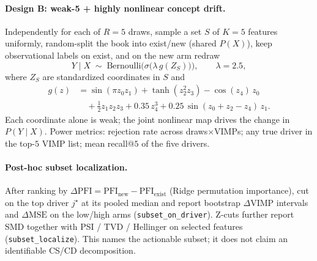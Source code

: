 \paragraph{Design B: weak-5 + highly nonlinear concept drift.}
Independently for each of $R=5$ draws, sample a set $S$ of $K=5$ features uniformly,
random-split the book into exist/new (shared $P(X)$), keep observational labels on
exist, and on the new arm redraw
\begin{equation}
  Y\mid X
  \;\sim\;
  \mathrm{Bernoulli}\!\bigl(
    \sigma\bigl(\lambda\, g(Z_S)\bigr)
  \bigr),
  \qquad
  \lambda=2.5,
\end{equation}
where $Z_S$ are standardized coordinates in $S$ and
\begin{equation}
\begin{aligned}
  g(z)
  &=
  \sin(\pi z_0 z_1)
  + \tanh(z_2^2 z_3)
  - \cos(z_4)\,z_0
  \\
  &\quad
  + \tfrac12 z_1 z_2 z_3
  + 0.35\, z_4^3
  + 0.25\, \sin(z_0+z_2-z_4)\, z_1.
\end{aligned}
\end{equation}
Each coordinate alone is weak; the joint nonlinear map drives the change in
$P(Y\mid X)$.
Power metrics: rejection rate across draws$\times$VIMPs; any true driver in the
top-$5$ VIMP list; mean recall@$5$ of the five drivers.

\paragraph{Post-hoc subset localization.}
After ranking by $\Delta\mathrm{PFI}=\mathrm{PFI}_{\mathrm{new}}-\mathrm{PFI}_{\mathrm{exist}}$
(Ridge permutation importance), cut on the top driver $j^\star$ at its pooled median
and report bootstrap $\Delta\mathrm{VIMP}$ intervals and $\Delta\mathrm{MSE}$ on the
low/high arms (\texttt{subset\_on\_driver}).
Z-cuts further report SMD together with PSI / TVD / Hellinger on selected features
(\texttt{subset\_localize}).
This names the actionable subset; it does not claim an identifiable CS/CD decomposition.

